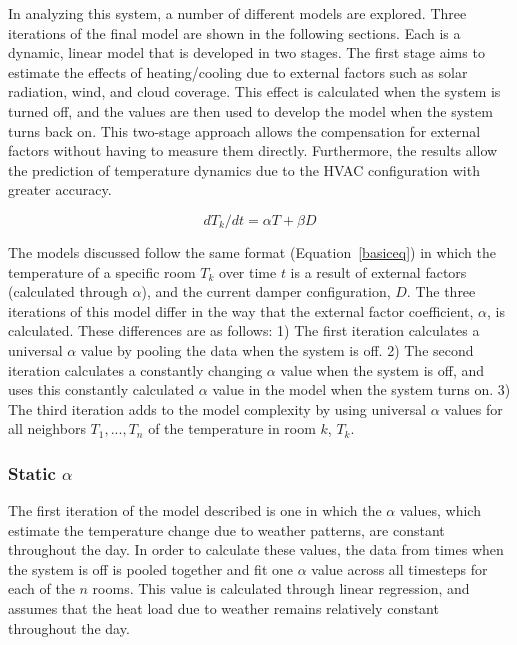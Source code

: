 In analyzing this system, a number of different models are explored. Three
iterations of the final model are shown in the following sections. Each is a
dynamic, linear model that is developed in two stages. The first stage aims to
estimate the effects of heating/cooling due to external factors such as solar
radiation, wind, and cloud coverage. This effect is calculated when the system
is turned off, and the values are then used to develop the model when the system
turns back on. This two-stage approach allows the compensation for external
factors without having to measure them directly. Furthermore, the results allow
the prediction of temperature dynamics due to the HVAC configuration with
greater accuracy.

\begin{equation}\label{basiceq}dT_k/dt=\alpha T+\beta D\end{equation}

The models discussed follow the same format (Equation~\ref{basiceq}) in which
the temperature of a specific room $T_k$ over time $t$ is a result of external
factors (calculated through $\alpha$), and the current damper configuration,
$D$. The three iterations of this model differ in the way that the external
factor coefficient, $\alpha$, is calculated. These differences are as follows:
1) The first iteration calculates a universal $\alpha$ value by pooling the data
when the system is off. 2) The second iteration calculates a constantly changing
$\alpha$ value when the system is off, and uses this constantly calculated
$\alpha$ value in the model when the system turns on. 3) The third iteration
adds to the model complexity by using universal $\alpha$ values for all
neighbors $T_1, ..., T_n$ of the temperature in room $k$, $T_k$.

\subsubsection{Static $\alpha$}
\label{sec:constantalpha}

The first iteration of the model described is one in which the $\alpha$ values,
which estimate the temperature change due to weather patterns, are constant
throughout the day. In order to calculate these values, the data from times when
the system is off is pooled together and fit one $\alpha$ value across all
timesteps for each of the $n$ rooms. This value is calculated through linear
regression, and assumes that the heat load due to weather remains relatively
constant throughout the day.

